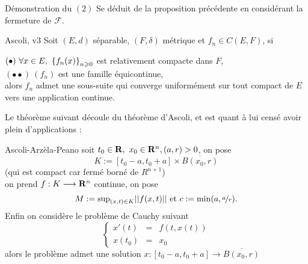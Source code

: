 \documentclass[a4paper,11pt, twoside]{article}
\begin{document}
\begin{ProofC}{Démonstration du $(\mathit 2)$}
  Se déduit de la proposition précédente en considérant la fermeture de $\mathcal F$.
\end{ProofC}



\begin{thC}{Ascoli, v3}
  Soit $(E,d)$ séparable, $(F,\delta)$ métrique et $f_n\in C(E,F)$, si

  $(\bullet)\ \forall x\in E,\ \ens{f_n(x)}_{n\geqslant 0}$ est relativement compacte dans $F$,\\
  $(\bullet\bullet)\ \left(f_n\right)$ est une famille équicontinue,\\

  alors $f_n$ admet une sous-suite qui converge uniformément sur tout compact de $E$ vers une application continue.
\end{thC}

\newpage
Le théorème suivant découle du théorème d'Ascoli, et est quant à lui censé avoir plein d'applications :

\begin{thC}{Ascoli-Arzèla-Peano}
  soit $t_0\in\mathbf R,\ x_0\in\mathbf R^n, (a,r)>0$, on pose 
  $$K:=[t_0-a,t_0+a]\times \overline{B(x_0,r)}$$
  (qui est compact car fermé borné de $R^{n+1}$)\\
  on prend $f:K\longrightarrow \mathbf R^n$ continue, on pose
  $$M:=\mathrm{sup}_{(x,t)\in K}||f(x,t)||\text{ et }c:=\mathrm{min}(a,\nicefrac{a}{r}).$$
  Enfin on considère le problème de Cauchy suivant 
  $$\left\{\begin{array}{rcl}
    x'(t)&=&f(t,x(t))\\
    x(t_0)&=&x_0
  \end{array}\right.$$
  alors le problème admet une solution $x:[t_0-a,t_0+a]\longrightarrow \overline{B(x_0,r)}$
\end{thC}
\end{document}
